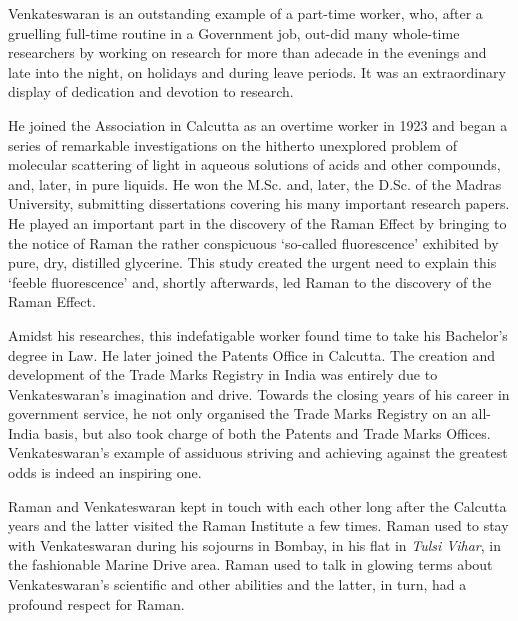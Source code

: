 \smallskip
\medskip
{}
\smallskip

\noindent
Venkateswaran is an outstanding example of a part-time worker, who, after a gruelling full-time routine in a Government job, out-did many whole-time researchers by working on research for more than a\break decade in the evenings and late into the night, on holidays and during leave periods. It was an extraordinary display of dedication and devotion to research.

He joined the Association in Calcutta as an overtime worker in 1923 and began a series of remarkable investigations on the hitherto unexplored problem of molecular scattering of light in aqueous solutions of acids and other compounds, and, later, in pure liquids. He won the M.Sc. and, later, the D.Sc. of the Madras University, submitting dissertations covering his many important research papers. He played an important part in the discovery of the Raman Effect by bringing to the notice of Raman the rather conspicuous `so-called fluorescence' exhibited by pure, dry, distilled glycerine. This study created the urgent need to explain this `feeble fluorescence' and, shortly afterwards, led Raman to the discovery of the Raman Effect.

Amidst his researches, this indefatigable worker found time to take his Bachelor's degree in Law. He later joined the Patents Office in Calcutta. The creation and development of the Trade Marks Registry in India was entirely due to Venkateswaran's imagination and drive. Towards the closing years of his career in government service, he not only organised the Trade Marks Registry on an all-India basis, but also took charge of both the Patents and Trade Marks Offices. Venkateswaran's example of assiduous striving and achieving against the greatest odds is indeed an inspiring one.

\newpage

Raman and Venkateswaran kept in touch with each other long after the Calcutta years and the latter visited the Raman Institute a few times. Raman used to stay with Venkateswaran during his sojourns in Bombay, in his flat in {\em Tulsi Vihar}, in the fashionable Marine Drive area. Raman used to talk in glowing terms about Venkateswaran's scientific and other abilities and the latter, in turn, had a profound respect for Raman.

\bigskip
{}
\smallskip

